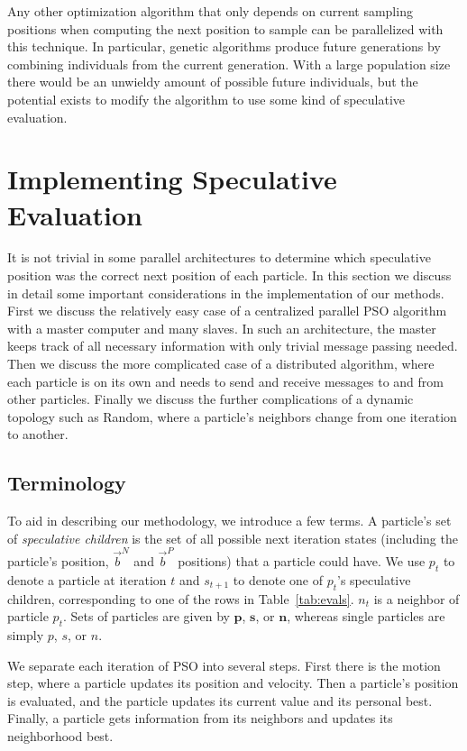\documentclass[ms,electronic,twosidetoc,letterpaper,chaptercenter,parttop,equalmargins]{byumsphd}
\providecommand{\pers}{\ensuremath{P}}
\providecommand{\neigh}{\ensuremath{N}}
\providecommand{\nbest}{\ensuremath{\Vec{b}^\neigh}}
\providecommand{\pbest}{\ensuremath{\Vec{b}^\pers}}
\providecommand{\p}{\ensuremath{p}}
\providecommand{\pset}{\ensuremath{\mathbf{p}}}
\providecommand{\s}{\ensuremath{s}}
\providecommand{\sset}{\ensuremath{\mathbf{s}}}
\providecommand{\n}{\ensuremath{n}}
\providecommand{\nset}{\ensuremath{\mathbf{n}}}
\begin{document}
Any other optimization algorithm that only depends on current sampling
positions when computing the next position to sample can be parallelized with
this technique.  In particular, genetic algorithms produce future generations
by combining individuals from the current generation.  With a large population
size there would be an unwieldy amount of possible future individuals, but the
potential exists to modify the algorithm to use some kind of speculative
evaluation.


\appendix
\chapter{Implementing Speculative Evaluation}
\label{sec:implementation}

It is not trivial in some parallel architectures to determine which speculative
position was the correct next position of each particle.  In this section we
discuss in detail some important considerations in the implementation of our
methods.  First we discuss the relatively easy case of a centralized parallel
PSO algorithm with a master computer and many slaves.  In such an architecture,
the master keeps track of all necessary information with only trivial message
passing needed.  Then we discuss the more complicated case of a distributed
algorithm, where each particle is on its own and needs to send and receive
messages to and from other particles.  Finally we discuss the further
complications of a dynamic topology such as Random, where a particle's
neighbors change from one iteration to another.

\section{Terminology}

To aid in describing our methodology, we introduce a few terms.  A particle's
set of \emph{speculative children} is the set of all possible next iteration
states (including the particle's position, $\nbest$ and $\pbest$ positions)
that a particle could have.  We use $\p_t$ to denote a particle at iteration
$t$ and $\s_{t+1}$ to denote one of $\p_t$'s speculative children,
corresponding to one of the rows in Table~\ref{tab:evals}.  $\n_t$ is a
neighbor of particle $\p_t$.  Sets of particles are given by $\pset$, $\sset$,
or $\nset$, whereas single particles are simply $\p$, $\s$, or $\n$.

We separate each iteration of PSO into several steps.  First there is the
motion step, where a particle updates its position and velocity.  Then a
particle's position is evaluated, and the particle updates its current value
and its personal best.  Finally, a particle gets information from its neighbors
and updates its neighborhood best.
\end{document}
